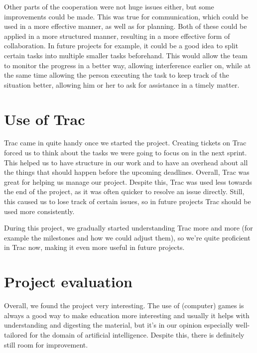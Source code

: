 Other parts of the cooperation were not huge issues either, but some improvements could be made. This was true for communication, which could be used in a more effective manner, as well as for planning. Both of these could be applied in a more structured manner, resulting in a more effective form of collaboration. In future projects for example, it could be a good idea to split certain tasks into multiple smaller tasks beforehand. This would allow the team to monitor the progress in a better way, allowing interference earlier on, while at the same time allowing the person executing the task to keep track of the situation better, allowing him or her to ask for assistance in a timely matter.

\section{Use of Trac}
Trac came in quite handy once we started the project. Creating tickets on Trac forced us to think about the tasks we were going to focus on in the next sprint. This helped us to have structure in our work and to have an overhead about all the things that should happen before the upcoming deadlines. Overall, Trac was great for helping us manage our project. Despite this, Trac was used less towards the end of the project, as it was often quicker to resolve an issue directly. Still, this caused us to lose track of certain issues, so in future projects Trac should be used more consistently.

During this project, we gradually started understanding Trac more and more (for example the milestones and how we could adjust them), so we're quite proficient in Trac now, making it even more useful in future projects.



\section{Project evaluation}
Overall, we found the project very interesting. The use of (computer) games is always a good way to make education more interesting and usually it helps with understanding and digesting the material, but it's in our opinion especially well-tailored for the domain of artificial intelligence. Despite this, there is definitely still room for improvement.\\


